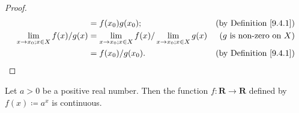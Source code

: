 \begin{proof}
\begin{align*}
                                                    & = f(x_0) g(x_0);                                                                         & \text{(by Definition \ref{9.4.1})}  \\
        \lim_{x \to x_0 ; x \in X} f(x) / g(x)      & = \lim_{x \to x_0 ; x \in X} f(x) / \lim_{x \to x_0 ; x \in X} g(x)                      & \text{(\(g\) is non-zero on \(X\))} \\
                                                    & = f(x_0) / g(x_0).                                                                       & \text{(by Definition \ref{9.4.1})}  \\
    \end{align*}
\end{proof}

\begin{proposition}\label{9.4.10}
    Let \(a > 0\) be a positive real number.
    Then the function \(f : \mathbf{R} \to \mathbf{R}\) defined by \(f(x) \coloneqq a^x\) is continuous.
\end{proposition}

